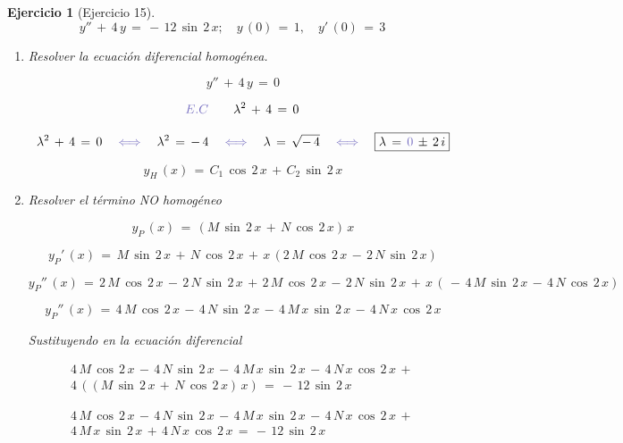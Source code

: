 \documentclass[a4paper,11pt, openany]{book}
\newtheorem{ejer}{Ejercicio}[section]
\newcommand*{\itembolasazules}[1]{%
\footnotesize\protect\tikz[baseline=-3pt]%
\protect\node[scale=.7, circle, shade, ball
color=green]{\color{white}\Large\bf#1};}
\begin{document}
\begin{ejer}[Ejercicio 15]

$$y''\,+\,4\,y\,=\,-\,12\,\sin\,2\,x; \quad y\,(0)\,=\,1, \quad y'\,(0)\,=\,3$$
 
\begin{enumerate}[label=\itembolasazules{\arabic*}]
 
\item Resolver la ecuación diferencial homogénea.
 
 
$$\boxed{y''\,+\,4\,y\,=\,0}$$
 
$$\textcolor{toolbox}{E.C} \qquad \lambda^{2}\,+\,4\,=\,0$$
 
$$\lambda^{2}\,+\,4\,=\,0 \quad \textcolor{toolbox}{\iff} \quad \lambda^{2}\,=\,-\,4 \quad \textcolor{toolbox}{\iff} \quad \lambda\,=\,\sqrt{-\,4} \quad \textcolor{toolbox}{\iff} \quad \boxed{\lambda\,=\,\textcolor{toolbox}{0}\,\pm\,2\,i}$$
 
$$\boxed{y_{H}\,(x)\,=\,C_{1}\,\cos\,2\,x\,+\,C_{2}\,\sin\,2\,x}$$
 
\item Resolver el término NO homogéneo
 
$$\boxed{y_{P}\,(x)\,=\,(M\,\sin\,2\,x\,+\,N\,\cos\,2\,x)\,x}$$
 
$$\boxed{y_{P}'\,(x)\,=\,M\,\sin\,2\,x\,+\,N\,\cos\,2\,x\,+\,x\,(2\,M\,\cos\,2\,x\,-\,2\,N\,\sin\,2\,x)}$$
 
$$y_{P}''\,(x)\,=\,2\,M\,\cos\,2\,x\,-\,2\,N\,\sin\,2\,x\,+\,2\,M\,\cos\,2\,x\,-\,2\,N\,\sin\,2\,x\,+\,x\,(\,-\,4\,M\,\sin\,2\,x\,-\,4\,N\,\cos\,2\,x)$$
 
$$\boxed{y_{P}''\,(x)\,=\,4\,M\,\cos\,2\,x\,-\,4\,N\,\sin\,2\,x\,-\,4\,M\,x\,\sin\,2\,x\,-\,4\,N\,x\,\cos\,2\,x}$$
 
Sustituyendo en la ecuación diferencial 
 
\begin{multline*}
4\,M\,\cos\,2\,x\,-\,4\,N\,\sin\,2\,x\,-\,4\,M\,x\,\sin\,2\,x\,-\,4\,N\,x\,\cos\,2\,x\,+\, \\
4\,\left((M\,\sin\,2\,x\,+\,N\,\cos\,2\,x)\,x \right)\,=\,-\,12\,\sin\,2\,x    
\end{multline*}
 
\begin{multline*}
4\,M\,\cos\,2\,x\,-\,4\,N\,\sin\,2\,x\,-\,4\,M\,x\,\sin\,2\,x\,-\,4\,N\,x\,\cos\,2\,x\,+\, \\
4\,M\,x\,\sin\,2\,x\,+\,4\,N\,x\,\cos\,2\,x\,=\,-\,12\,\sin\,2\,x    
\end{multline*}
 

\end{enumerate}
\end{ejer}
\end{document}
